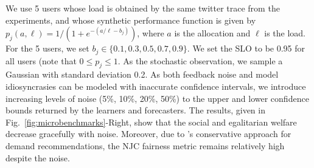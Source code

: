 We use 5 users whose load is obtained
by the same twitter trace from the experiments, and whose synthetic performance function is given by
$p_j(a, \ell) = 1/(1+e^{-(a/\ell - b_j)})$, where $a$ is the allocation and $\ell$ is the load.
For the 5 users, we set $b_j\in \{0.1, 0.3, 0.5, 0.7, 0.9\}$.
We set the SLO to be 0.95 for all users (note that $0\leq p_j\leq 1$.
As the stochastic observation, we sample a Gaussian with standard deviation 0.2.
As both feedback noise and model idiosyncrasies can be modeled with inaccurate confidence intervals,
we introduce increasing levels of noise (5\%, 10\%, 20\%, 50\%) to the 
upper and lower confidence bounds returned by the learners and forecasters.
The results, given in Fig.~\ref{fig:microbenchmarks}-Right, show that the social and egalitarian
welfare decrease gracefully with noise.
Moreover, due to \cilantronjc's conservative approach for demand recommendations, the NJC fairness
metric remains relatively high despite the noise.






% 

